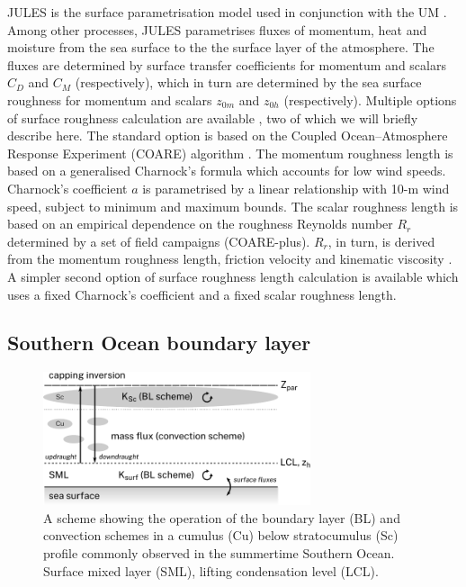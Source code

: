 JULES is the surface parametrisation model used in conjunction with the UM \citep{best2011,clark2011}.
Among other processes, JULES parametrises fluxes of momentum, heat and moisture from
the sea surface to the the surface layer of the atmosphere. The fluxes are
determined by surface transfer coefficients for momentum and scalars $C_D$ and
$C_M$ (respectively), which in turn are determined by the sea surface roughness
for momentum and scalars $z_{0m}$ and $z_{0h}$ (respectively). Multiple options
of surface roughness calculation are available \citep{umdp024}, two of which we will briefly
describe here. The standard option is based on the
Coupled Ocean--Atmosphere Response Experiment (COARE) algorithm
\citep{fairall2003}. The momentum roughness length is based on
a generalised Charnock's formula which accounts for low wind speeds.
Charnock's coefficient $a$ is parametrised by a linear
relationship with 10-m wind speed, subject to minimum and maximum bounds.
The scalar roughness length is based on an empirical dependence on the
roughness Reynolds number $R_r$ determined by a set of field campaigns (COARE-plus).
$R_r$, in turn, is derived from the momentum roughness length, friction velocity
and kinematic viscosity \citep{fairall2003}.
A simpler second option of surface roughness length calculation is available
which uses a fixed Charnock's coefficient and a fixed scalar roughness length.


\subsection{Southern Ocean boundary layer}
\label{sec:4:schemes}

\begin{figure}[t]
\centering
\includegraphics[width=0.7\textwidth]{chapter4/fig/scheme_rev1.pdf}
\caption[A scheme showing the operation of the boundary layer and convection schemes]{A scheme showing the operation of the boundary layer (BL)
and convection schemes in a cumulus (Cu) below stratocumulus (Sc) profile
commonly observed in the summertime Southern Ocean. Surface mixed layer (SML),
lifting condensation level (LCL).
}
\label{fig:4:scheme}
\end{figure}

